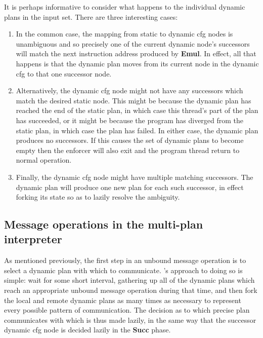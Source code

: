 It is perhaps informative to consider what happens to the individual
dynamic plans in the input set.  There are three interesting cases:
\begin{enumerate}
\item In the common case, the mapping from static to \gls{dynamic cfg}
  nodes is unambiguous and so precisely one of the current dynamic
  node's successors will match the next instruction address produced
  by \textbf{Emul}.  In effect, all that happens is that the dynamic
  plan moves from its current node in the \gls{dynamic cfg} to that
  one successor node.

\item Alternatively, the \gls{dynamic cfg} node might not have any
  successors which match the desired static node.  This might be
  because the dynamic plan has reached the end of the static plan, in
  which case this thread's part of the plan has succeeded, or it might
  be because the program has diverged from the static plan, in which
  case the plan has failed.  In either case, the dynamic plan produces
  no successors.  If this causes the set of dynamic plans to become
  empty then the enforcer will also exit and the program thread return
  to normal operation.

\item Finally, the \gls{dynamic cfg} node might have multiple matching
  successors.  The dynamic plan will produce one new plan for each
  such successor, in effect forking its state so as to lazily resolve
  the ambiguity.
\end{enumerate}

\subsection{Message operations in the multi-plan interpreter}
\label{sect:enforce:hli_messages}

As mentioned previously, the first step in an unbound message
operation is to select a dynamic plan with which to communicate.
{\Implementation}'s approach to doing so is simple: wait for some
short interval, gathering up all of the dynamic plans which reach an
appropriate unbound message operation during that time, and then fork
the local and remote dynamic plans as many times as necessary to
represent every possible pattern of communication.  The decision as to
which precise plan communicates with which is thus made lazily, in the
same way that the successor \gls{dynamic cfg} node is decided lazily
in the \textbf{Succ} phase.

